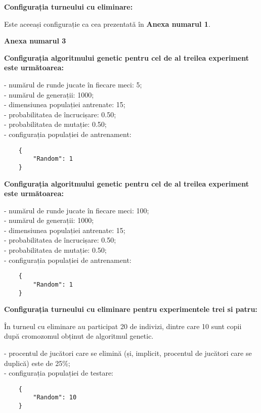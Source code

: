 \textbf{Configurația turneului cu eliminare: }

Este aceeași configurație ca cea prezentată în \textbf{Anexa numarul 1}.

\clearpage

\begin{center}
	\textbf{Anexa numarul 3}
\end{center}

\textbf{Configurația algoritmului genetic pentru cel de al treilea experiment este următoarea: }

- numărul de runde jucate în fiecare meci: 5;\\
- numărul de generații: 1000;\\
- dimensiunea populației antrenate: 15;\\
- probabilitatea de încrucișare: 0.50;\\
- probabilitatea de mutație: 0.50;\\
- configurația populației de antrenament:\\
\begin{center}
	\begin{lstlisting}
	{
		"Random": 1
	}
	\end{lstlisting}
\end{center}

\textbf{Configurația algoritmului genetic pentru cel de al treilea experiment este următoarea: }

- numărul de runde jucate în fiecare meci: 100;\\
- numărul de generații: 1000;\\
- dimensiunea populației antrenate: 15;\\
- probabilitatea de încrucișare: 0.50;\\
- probabilitatea de mutație: 0.50;\\
- configurația populației de antrenament:\\
\begin{center}
	\begin{lstlisting}
	{
		"Random": 1
	}
	\end{lstlisting}
\end{center}

\textbf{Configurația turneului cu eliminare pentru experimentele trei si patru: }

În turneul cu eliminare au participat 20 de indivizi, dintre care 10 sunt copii după cromozomul obținut de algoritmul genetic. 

- procentul de jucători care se elimină (și, implicit, procentul de jucători care se duplică) este de 25\%;\\
- configurația populației de testare:\\
\begin{center}
	\begin{lstlisting}
	{
		"Random": 10
	}
	\end{lstlisting}
\end{center}

\clearpage